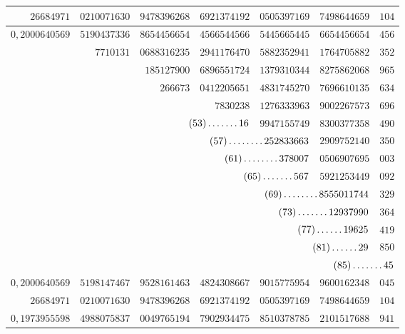 \begin{longtable}{@{}rrrrrrr@{}}
\hline
$26684971$ & $0210071630$ & $9478396268$ & $6921374192$ & $0505397169$ & $7498644659$ & $104$\\
\hline
$0{,}2000640569$ & $5190437336$ & $8654456654$ & $4566544566$ & $5445665445$ & $6654456654$ & $456$\\
 & $7710131$ & $0688316235$ & $2941176470$ & $5882352941$ & $1764705882$ & $352$\\
 &  & $185127900$ & $6896551724$ & $1379310344$ & $8275862068$ & $965$\\
 &  & $266673$ & $0412205651$ & $4831745270$ & $7696610135$ & $634$\\
 &  &  & $7830238$ & $1276333963$ & $9002267573$ & $696$\\
 &  & \multicolumn{2}{r}{$(53)\mathinner{.\,.\,.\,.\,.\,.\,.}16$} & $9947155749$ & $8300377358$ & $490$\\
 &  &  & \multicolumn{2}{r}{$(57)\mathinner{.\,.\,.\,.\,.\,.\,.\,.}252833663$} & $2909752140$ & $350$\\
 &  &  & \multicolumn{2}{r}{$(61)\mathinner{.\,.\,.\,.\,.\,.\,.\,.}378007$} & $0506907695$ & $003$\\
 &  &  & \multicolumn{2}{r}{$(65)\mathinner{.\,.\,.\,.\,.\,.\,.}567$} & $5921253449$ & $092$\\
 &  &  &  & \multicolumn{2}{r}{$(69)\mathinner{.\,.\,.\,.\,.\,.\,.\,.}8555011744$} & $329$\\
 &  &  &  & \multicolumn{2}{r}{$(73)\mathinner{.\,.\,.\,.\,.\,.\,.}12937990$} & $364$\\
 &  &  &  & \multicolumn{2}{r}{$(77)\mathinner{.\,.\,.\,.\,.\,.}19625$} & $419$\\
 &  &  &  & \multicolumn{2}{r}{$(81)\mathinner{.\,.\,.\,.\,.\,.}29$} & $850$\\
 &  &  &  &  & \multicolumn{2}{r}{$(85)\mathinner{.\,.\,.\,.\,.\,.\,.}45$}\\
\hline
$0{,}2000640569$ & $5198147467$ & $9528161463$ & $4824308667$ & $9015775954$ & $9600162348$ & $045$\\
$26684971$ & $0210071630$ & $9478396268$ & $6921374192$ & $0505397169$ & $7498644659$ & $104$\\
\hline
$0{,}1973955598$ & $4988075837$ & $0049765194$ & $7902934475$ & $8510378785$ & $2101517688$ & $941$\\
\end{longtable}\endgroup
